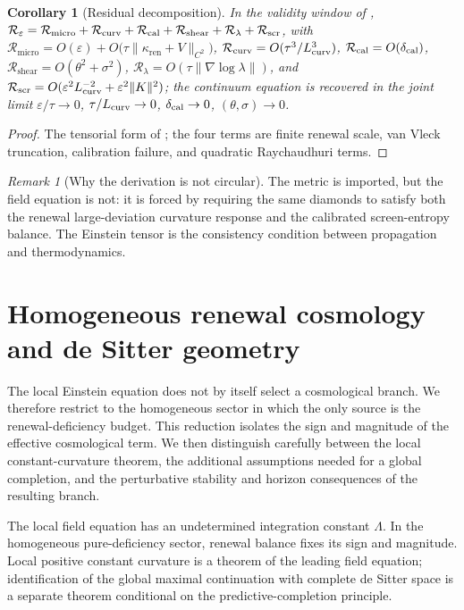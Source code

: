 \documentclass[11pt]{article}
\newtheorem{corollary}[theorem]{Corollary}
\theoremstyle{definition}
\theoremstyle{remark}
\newtheorem{remark}[theorem]{Remark}
\newcommand{\eps}{\varepsilon}
\newcommand{\ren}{\mathrm{ren}}
\newcommand{\Rmicro}{\mathcal R_{\mathrm{micro}}}
\newcommand{\Rcurv}{\mathcal R_{\mathrm{curv}}}
\newcommand{\Rcal}{\mathcal R_{\mathrm{cal}}}
\newcommand{\Rshear}{\mathcal R_{\mathrm{shear}}}
\begin{document}
\begin{corollary}[Residual decomposition]
\label{cor:residual-decomposition}
In the validity window of ,
$\mathcal R_\eps=\Rmicro+\Rcurv+\Rcal+\Rshear+\mathcal R_\lambda+\mathcal R_{\rm scr}$,
with
\(\Rmicro=O(\eps)+O\!\bigl(\tau\|\kappa_{\ren}+V\|_{C^2}\bigr)\),
$\Rcurv=O(\tau^3/L_{\rm curv}^3)$, $\Rcal=O(\delta_{\rm cal})$,
$\Rshear=O(\theta^2+\sigma^2)$,
$\mathcal R_\lambda=O(\tau\|\nabla\log\lambda\|)$, and
$\mathcal R_{\rm scr}=O(\eps^2L_{\rm curv}^{-2}+\eps^2\|K\|^2)$; the continuum equation is recovered in the joint
limit $\eps/\tau\to0$, $\tau/L_{\rm curv}\to0$, $\delta_{\rm cal}\to0$,
$(\theta,\sigma)\to0$.
\end{corollary}

\begin{proof}
The tensorial form of ; the four terms are finite
renewal scale, van Vleck truncation, calibration failure, and quadratic
Raychaudhuri terms.
\end{proof}

\begin{remark}[Why the derivation is not circular]
The metric is imported, but the field equation is not: it is forced by requiring
the same diamonds to satisfy both the renewal large-deviation curvature response
and the calibrated screen-entropy balance.  The Einstein tensor is the consistency
condition between propagation and thermodynamics.
\end{remark}

\section{Homogeneous renewal cosmology and de Sitter geometry}
\label{sec:desitter}

The local Einstein equation does not by itself select a cosmological branch.
We therefore restrict to the homogeneous sector in which the only source is the
renewal-deficiency budget.  This reduction isolates the sign and magnitude of
the effective cosmological term.  We then distinguish carefully between the
local constant-curvature theorem, the additional assumptions needed for a
global completion, and the perturbative stability and horizon consequences of
the resulting branch.

The local field equation has an undetermined integration constant $\Lambda$.  In
the homogeneous pure-deficiency sector, renewal balance fixes its sign and
magnitude.  Local positive constant curvature is a theorem of the leading field
equation; identification of the global maximal continuation with complete de
Sitter space is a separate theorem conditional on the predictive-completion
principle.
\end{document}
